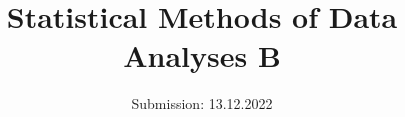 

\subject{Sheet 7}
\title{Statistical Methods of Data Analyses B}
\date{
  Submission: 13.12.2022
}


\maketitle


\newpage




